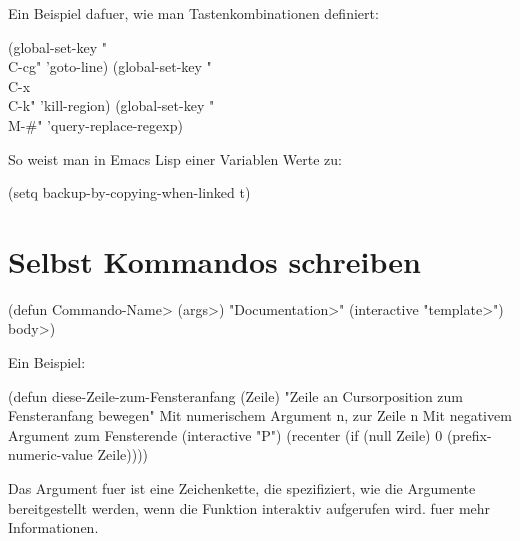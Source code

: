 
Ein Beispiel dafuer, wie man Tastenkombinationen definiert:

\beginexample%
(global-set-key "\\C-cg" 'goto-line)
(global-set-key "\\C-x\\C-k" 'kill-region)
(global-set-key "\\M-\#" 'query-replace-regexp)
\endexample

So weist man in Emacs Lisp einer Variablen Werte zu:

\beginexample%
(setq backup-by-copying-when-linked t)
\endexample

\section{Selbst Kommandos schreiben}

\beginexample%
(defun \<Commando-Name> (\<args>)
  "\<Documentation>"
  (interactive "\<template>")
  \<body>)
\endexample

Ein Beispiel:

\beginexample%
(defun diese-Zeile-zum-Fensteranfang (Zeile)
  "Zeile an Cursorposition zum Fensteranfang bewegen"
Mit numerischem Argument n, zur Zeile n
Mit negativem Argument zum Fensterende
  (interactive "P")
  (recenter (if (null Zeile)
                0
              (prefix-numeric-value Zeile))))
\endexample

Das Argument fuer  ist eine Zeichenkette, die spe\-zi\-fi\-ziert, wie die
Ar\-gu\-men\-te be\-reit\-ge\-stellt wer\-den, wenn die Funktion inter\-aktiv auf\-ge\-ru\-fen wird.
 fuer mehr Informationen.

\copyrightnotice

\bye

